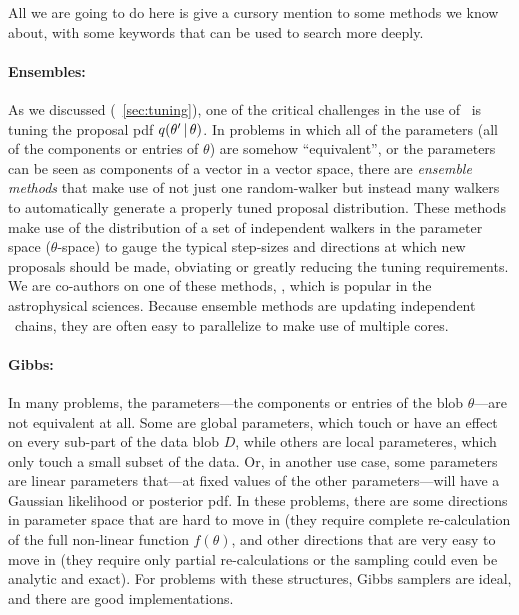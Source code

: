 \documentclass[12pt,twoside,pdftex]{article}
\newcommand{\MCMC}{\acronym{MCMC}}
\newcommand{\data}{D}
\newcommand{\pars}{\theta}
\begin{document}
All we are going to do here is give a cursory mention to some methods
we know about, with some keywords that can be used to search more
deeply.

%
%


\paragraph{Ensembles:}
As we discussed (\sectionname~\ref{sec:tuning}), one of the critical challenges in the use of
\MCMC\ is tuning the proposal pdf $q(\pars'\given\pars)$.
In problems in which all of the parameters (all of the components or entries of $\pars$) are somehow ``equivalent'',
or the parameters can be seen as components of a vector in a vector
space, there are \emph{ensemble methods} that make use of not just one
random-walker but instead many walkers to automatically generate a properly tuned
proposal distribution.
These methods make use of the distribution of a set of independent
walkers in the parameter space ($\pars$-space) to gauge the typical step-sizes and
directions at which new proposals should be made, obviating or greatly
reducing the tuning requirements.
We are co-authors on one of these methods, , which is popular in the astrophysical sciences.
Because ensemble methods are updating independent \MCMC\ chains, they
are often easy to parallelize to make use of multiple cores.

\paragraph{Gibbs:}
In many problems, the parameters---the components or entries of the
blob $\pars$---are not equivalent at all.
Some are global parameters, which touch or have an effect on every
sub-part of the data blob $\data$, while others are local parameteres,
which only touch a small subset of the data.
Or, in another use case, some parameters are linear parameters
that---at fixed values of the other parameters---will have a Gaussian
likelihood or posterior pdf.
In these problems, there are some directions in parameter space that
are hard to move in (they require complete re-calculation of the full
non-linear function $f(\pars)$, and other directions that are very
easy to move in (they require only partial re-calculations or the
sampling could even be analytic and exact).
For problems with these structures, Gibbs samplers are ideal, and
there are good implementations.
\end{document}
